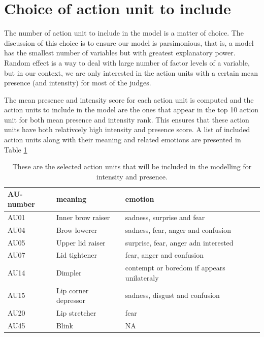 \documentclass{monashthesis}
\begin{document}
\let\cleardoublepage\clearpage

\newpage

\hypertarget{choice-of-action-unit-to-include}{%
\section{Choice of action unit to include}\label{choice-of-action-unit-to-include}}

The number of action unit to include in the model is a matter of choice. The discussion of this choice is to ensure our model is parsimonious, that is, a model has the smallest number of variables but with greatest explanatory power. Random effect is a way to deal with large number of factor levels of a variable, but in our context, we are only interested in the action units with a certain mean presence (and intensity) for most of the judges.

The mean presence and intensity score for each action unit is computed and the action units to include in the model are the ones that appear in the top 10 action unit for both mean presence and intensity rank. This ensures that these action units have both relativcely high intensity and presence score. A list of included action units along with their meaning and related emotions are presented in Table \ref{tab:au-included}

\begin{table}[ht]
\begin{center}
\caption{\label{tab:au-included} These are the selected action units that will be included in the modelling for intensity and presence.}
\begin{tabular}{lll}
\toprule
AU-number & meaning & emotion \\
\midrule
AU01 & Inner brow raiser & sadness, surprise and fear \\
AU04 & Brow lowerer & sadness, fear, anger and confusion \\
AU05 & Upper lid raiser & surprise, fear, anger adn interested \\
AU07 & Lid tightener & fear, anger and confusion \\
AU14 & Dimpler & contempt or boredom if appears unilateraly \\
AU15 & Lip corner depressor & sadness, disgust and confusion \\
AU20 & Lip stretcher & fear \\
AU45 & Blink & NA \\
\bottomrule
\end{tabular}
\end{center}
\end{table}
\end{document}

